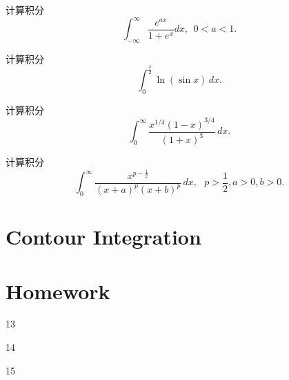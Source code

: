 \documentclass[CJK]{beamer}
\begin{document}
\begin{frame}
  \bch

  计算积分$$\int_{-\infty}^\infty \frac{e^{ax}}{1+e^x} dx, \ \ 0<a<1.$$
  \ech
\end{frame}

\begin{frame}
  \bch
  计算积分$$ \int_0^{\frac{\pi}{2}}\ln\left(\sin x\right)\, dx.$$
  \ech
\end{frame}


\begin{frame}
  \bch
  计算积分$$ \int_0^{\infty} \frac{x^{1/4}(1-x)^{3/4}}{(1+x)^3}\, dx.$$
  \ech
\end{frame}


\begin{frame}
  \bch
  计算积分$$ \int_0^{\infty}\frac{x^{p-\frac{1}{2}}}{(x+a)^p(x+b)^p}\, dx,\ \ \ p>\frac{1}{2}, a>0, b>0.$$
  \ech
\end{frame}

\section{Contour Integration}






\section{Homework}

\begin{frame}
  \bch
  \bitem
\item[13]{}
\item[14]{}
\item[15]{}
  \eitem
  \ech
\end{frame}
\end{document}
